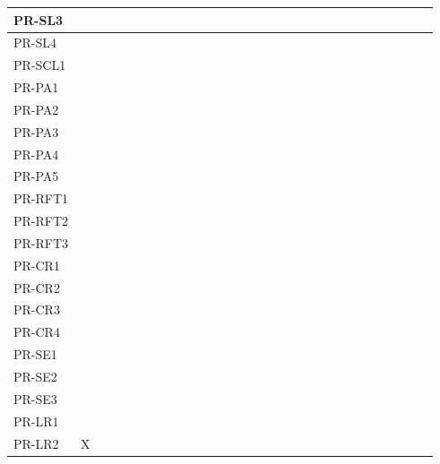 \documentclass[12pt, titlepage]{article}
\begin{document}
\begin{table}[H]
{\begin{tabular}{|l|l|l|l|l|l|l|l|l|l|l|l|l|l|l|l|l|l|l|}
      PR-SL3 & ~ & ~ & ~ & ~ & ~ & ~ & ~ & ~ & ~ & ~ & ~ & ~ & ~ & ~ & ~ & ~ & ~ & ~ \\ \hline
      PR-SL4 & ~ & ~ & ~ & ~ & ~ & ~ & ~ & ~ & ~ & ~ & ~ & ~ & ~ & ~ & ~ & ~ & ~ & ~ \\ \hline
      PR-SCL1 & ~ & ~ & ~ & ~ & ~ & ~ & ~ & ~ & ~ & ~ & ~ & ~ & ~ & ~ & ~ & ~ & ~ & ~ \\ \hline
      PR-PA1 & ~ & ~ & ~ & ~ & ~ & ~ & ~ & ~ & ~ & ~ & ~ & ~ & ~ & ~ & ~ & ~ & ~ & ~ \\ \hline
      PR-PA2 & ~ & ~ & ~ & ~ & ~ & ~ & ~ & ~ & ~ & ~ & ~ & ~ & ~ & ~ & ~ & ~ & ~ & ~ \\ \hline
      PR-PA3 & ~ & ~ & ~ & ~ & ~ & ~ & ~ & ~ & ~ & ~ & ~ & ~ & ~ & ~ & ~ & ~ & ~ & ~ \\ \hline
      PR-PA4 & ~ & ~ & ~ & ~ & ~ & ~ & ~ & ~ & ~ & ~ & ~ & ~ & ~ & ~ & ~ & ~ & ~ & ~ \\ \hline
      PR-PA5 & ~ & ~ & ~ & ~ & ~ & ~ & ~ & ~ & ~ & ~ & ~ & ~ & ~ & ~ & ~ & ~ & ~ & ~ \\ \hline
      PR-RFT1 & ~ & ~ & ~ & ~ & ~ & ~ & ~ & ~ & ~ & ~ & ~ & ~ & ~ & ~ & ~ & ~ & ~ & ~ \\ \hline
      PR-RFT2 & ~ & ~ & ~ & ~ & ~ & ~ & ~ & ~ & ~ & ~ & ~ & ~ & ~ & ~ & ~ & ~ & ~ & ~ \\ \hline
      PR-RFT3 & ~ & ~ & ~ & ~ & ~ & ~ & ~ & ~ & ~ & ~ & ~ & ~ & ~ & ~ & ~ & ~ & ~ & ~ \\ \hline
      PR-CR1 & ~ & ~ & ~ & ~ & ~ & ~ & ~ & ~ & ~ & ~ & ~ & ~ & ~ & ~ & ~ & ~ & ~ & ~ \\ \hline
      PR-CR2 & ~ & ~ & ~ & ~ & ~ & ~ & ~ & ~ & ~ & ~ & ~ & ~ & ~ & ~ & ~ & ~ & ~ & ~ \\ \hline
      PR-CR3 & ~ & ~ & ~ & ~ & ~ & ~ & ~ & ~ & ~ & ~ & ~ & ~ & ~ & ~ & ~ & ~ & ~ & ~ \\ \hline
      PR-CR4 & ~ & ~ & ~ & ~ & ~ & ~ & ~ & ~ & ~ & ~ & ~ & ~ & ~ & ~ & ~ & ~ & ~ & ~ \\ \hline
      PR-SE1 & ~ & ~ & ~ & ~ & ~ & ~ & ~ & ~ & ~ & ~ & ~ & ~ & ~ & ~ & ~ & ~ & ~ & ~ \\ \hline
      PR-SE2 & ~ & ~ & ~ & ~ & ~ & ~ & ~ & ~ & ~ & ~ & ~ & ~ & ~ & ~ & ~ & ~ & ~ & ~ \\ \hline
      PR-SE3 & ~ & ~ & ~ & ~ & ~ & ~ & ~ & ~ & ~ & ~ & ~ & ~ & ~ & ~ & ~ & ~ & ~ & ~ \\ \hline
      PR-LR1 & ~ & ~ & ~ & ~ & ~ & ~ & ~ & ~ & ~ & ~ & ~ & ~ & ~ & ~ & ~ & ~ & ~ & ~ \\ \hline
      PR-LR2 & X & ~ & ~ & ~ & ~ & ~ & ~ & ~ & ~ & ~ & ~ & ~ & ~ & ~ & ~ & ~ & ~ & ~ \\ \hline

\end{tabular}}
\end{table}
\end{document}
